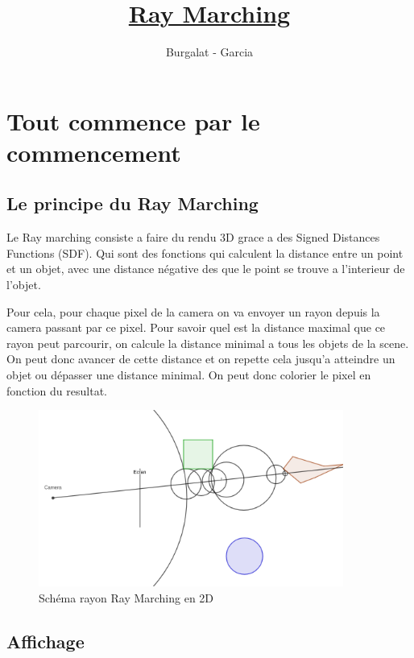 \documentclass{article}
\title{\underline{Ray Marching}}
\date{}
\author{Burgalat - Garcia}
\begin{document}
\maketitle
\tableofcontents
\clearpage

\section{Tout commence par le commencement}
\subsection{Le principe du Ray Marching}

Le Ray marching consiste a faire du rendu 3D grace a des Signed Distances Functions (SDF). 
Qui sont des fonctions qui calculent la distance entre un point et un objet, avec une distance négative des que le point se trouve a l'interieur de l'objet.

Pour cela, pour chaque pixel de la camera on va envoyer un rayon depuis la camera passant par ce pixel. 
Pour savoir quel est la distance maximal que ce rayon peut parcourir, on calcule la distance minimal a tous les objets de la scene. 
On peut donc avancer de cette distance et on repette cela jusqu'a atteindre un objet ou dépasser une distance minimal. 
On peut donc colorier le pixel en fonction du resultat.

\begin{figure}[H]
    \begin{center}
        \includegraphics[width=10cm]{images/Shema_1_ray_marching_2d.png}\caption{Schéma rayon Ray Marching en 2D}
    \end{center}
\end{figure}



\subsection{Affichage}
\end{document}
